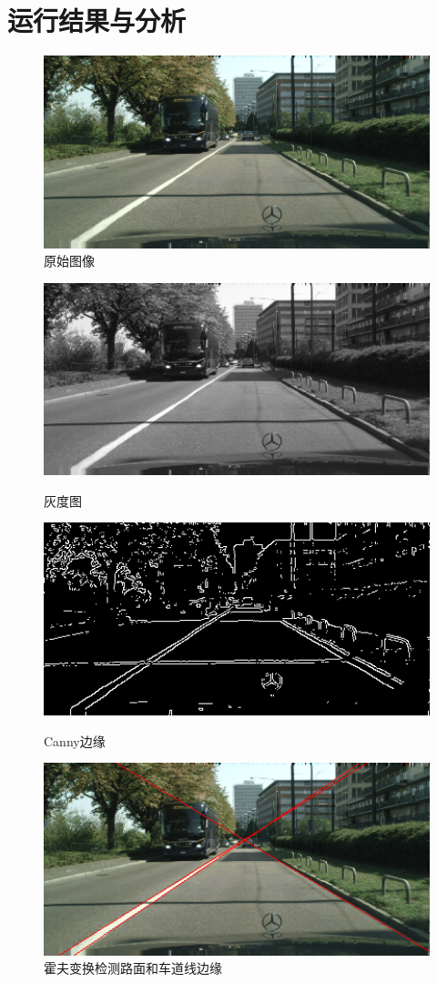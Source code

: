 \documentclass[a4paper]{ctexart}
\begin{document}
  \section{运行结果与分析}
    \begin{figure}[H]
      \includegraphics*[width=1.0\textwidth]{fig/raw.png}
      \caption{原始图像}
    \end{figure}
    \newpage
    \begin{figure}[H]
      \includegraphics*[width=1.0\textwidth]{fig/gray.png}
      \caption{灰度图}
      \includegraphics*[width=1.0\textwidth]{fig/edge.png}
      \caption{Canny边缘}
      \includegraphics*[width=1.0\textwidth]{fig/block.png}
      \caption{霍夫变换检测路面和车道线边缘}
    \end{figure}
\end{document}
